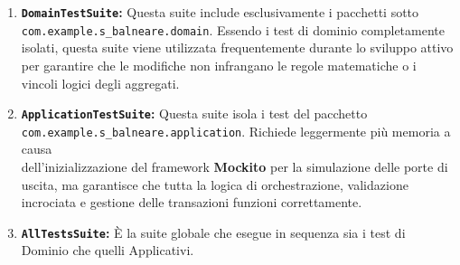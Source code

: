 \documentclass[a4paper,11pt]{article}
\begin{document}
\begin{enumerate}
	\item \textbf{\texttt{DomainTestSuite}:} Questa suite include esclusivamente i pacchetti sotto \newline \texttt{com.example.s\_balneare.domain}. Essendo i test di dominio completamente isolati, questa suite viene utilizzata frequentemente durante lo sviluppo attivo per garantire che le modifiche non infrangano le regole matematiche o i vincoli logici degli aggregati.
	
	\item \textbf{\texttt{ApplicationTestSuite}:} Questa suite isola i test del pacchetto \\ \texttt{com.example.s\_balneare.application}. Richiede leggermente più memoria a causa \\ dell'inizializzazione del framework \textbf{Mockito} per la simulazione delle porte di uscita, ma garantisce che tutta la logica di orchestrazione, validazione incrociata e gestione delle transazioni funzioni correttamente.
	
	\item \textbf{\texttt{AllTestsSuite}:} È la suite globale che esegue in sequenza sia i test di Dominio che quelli Applicativi.
\end{enumerate}
\end{document}
